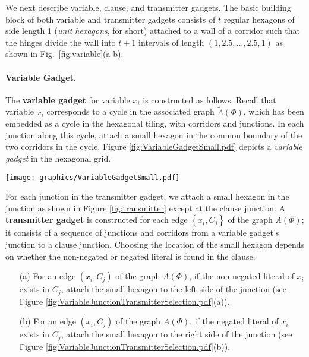 \documentclass[10pt]{CSUNthesis}
\theoremstyle{plain}%
\theoremstyle{definition}
\theoremstyle{remark}
\begin{document}
We next describe variable, clause, and transmitter gadgets.
The basic building block of both variable and transmitter gadgets consists of $t$ regular hexagons of side length 1 (\emph{unit hexagons}, for short) attached to a wall of a corridor such that the hinges divide the wall into $t+1$ intervals of length $(1,2.5,\ldots ,2.5,1)$ as shown in Fig.~\ref{fig:variable}(a-b). 

\paragraph{Variable Gadget.}
The {\bf variable gadget} for variable $x_i$ is constructed as follows. 
Recall that variable $x_i$ corresponds to a cycle in the associated graph $\tilde{A}(\Phi)$, which has been embedded as a cycle in the hexagonal tiling, with corridors and junctions. 
In each junction along this cycle, attach a small hexagon in the common boundary of the two corridors in the cycle. 
Figure \ref{fig:VariableGadgetSmall.pdf} depicts a \textit{variable gadget} in the hexagonal grid.

\begin{minipage}{\linewidth}
\begin{center}
\texttt{[image: graphics/VariableGadgetSmall.pdf]}
\label{fig:VariableGadgetSmall.pdf}
\end{center}
\end{minipage}

For each junction in the transmitter gadget, we attach a small hexagon in the junction as shown in Figure \ref{fig:transmitter} except at the clause junction.
 A {\bf transmitter gadget} is constructed for each edge $\left\lbrace x_i,C_j\right\rbrace$ of the graph $A(\Phi)$; it consists of a sequence of junctions and corridors from a variable gadget's junction to a clause junction.  
Choosing the location of the small hexagon depends on whether the non-negated or negated literal is found in the clause.
\begin{itemize}
\item[(a)]  For an edge $(x_i,C_j)$ of the graph $A(\Phi)$, if the non-negated literal of $x_i$ exists in $C_j$, attach the small hexagon to the left side of the junction (see Figure \ref{fig:VariableJunctionTransmitterSelection.pdf}(a)).
\item[(b)]  For an edge $(x_i,C_j)$ of the graph $A(\Phi)$, if the negated literal of $x_i$ exists in $C_j$, attach the small hexagon to the right side of the junction (see Figure \ref{fig:VariableJunctionTransmitterSelection.pdf}(b)).
\end{itemize}
\end{document}
